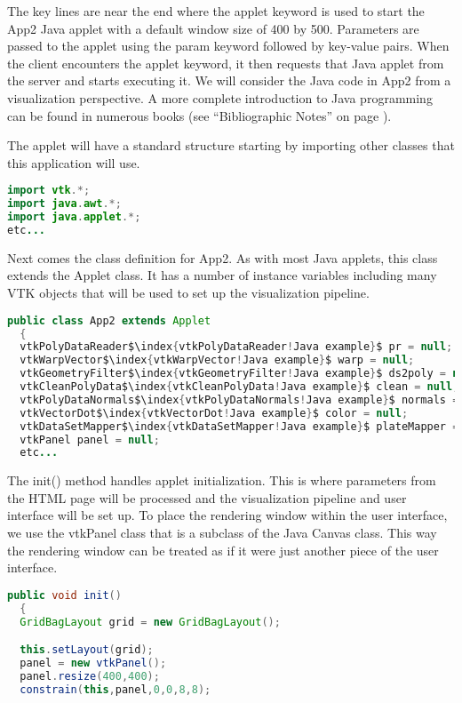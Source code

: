 The key lines are near the end where the applet keyword is used to start the App2 Java applet with a default window size of 400 by 500. Parameters are passed to the applet using the param keyword followed by key-value pairs. When the client encounters the applet keyword, it then requests that Java applet from the server and starts executing it. We will consider the Java code in App2 from a visualization perspective. A more complete introduction to Java programming can be found in numerous books (see ``Bibliographic Notes'' on page \pageref{sec:ch11.bibliographic_notes}).

The applet will have a standard structure starting by importing other classes that this application will use.

\begin{lstlisting}[language=Java, caption={}, numbers=none, frame=none]
import vtk.*;
import java.awt.*;
import java.applet.*;
etc...
\end{lstlisting}

Next comes the class definition for App2. As with most Java applets, this class extends the Applet class. It has a number of instance variables including many VTK objects that will be used to set up the visualization pipeline.

\begin{lstlisting}[language=Java, caption={}, numbers=none, frame=none, escapechar=\$]
public class App2 extends Applet
  {
  vtkPolyDataReader$\index{vtkPolyDataReader!Java example}$ pr = null;
  vtkWarpVector$\index{vtkWarpVector!Java example}$ warp = null;
  vtkGeometryFilter$\index{vtkGeometryFilter!Java example}$ ds2poly = null;
  vtkCleanPolyData$\index{vtkCleanPolyData!Java example}$ clean = null;
  vtkPolyDataNormals$\index{vtkPolyDataNormals!Java example}$ normals = null;
  vtkVectorDot$\index{vtkVectorDot!Java example}$ color = null;
  vtkDataSetMapper$\index{vtkDataSetMapper!Java example}$ plateMapper = null;
  vtkPanel panel = null;
  etc...
\end{lstlisting}

The init() method handles applet initialization. This is where parameters from the HTML page will be processed and the visualization pipeline and user interface will be set up. To place the rendering window within the user interface, we use the vtkPanel class that is a subclass of the Java Canvas class. This way the rendering window can be treated as if it were just another piece of the user interface.

\begin{lstlisting}[language=Java, caption={}, numbers=none, frame=none]
public void init()
  {
  GridBagLayout grid = new GridBagLayout();

  this.setLayout(grid);
  panel = new vtkPanel();
  panel.resize(400,400);
  constrain(this,panel,0,0,8,8);
\end{lstlisting}


